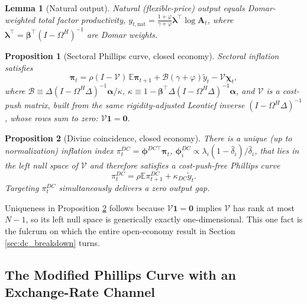 \documentclass[12pt]{article}
\newtheorem{lemma}{Lemma}
\newtheorem{proposition}{Proposition}
\begin{document}
\begin{lemma}[Natural output]
\label{lem:natural_output}
Natural (flexible-price) output equals Domar-weighted total factor productivity,
$y_{t,\mathrm{nat}} = \tfrac{1+\varphi}{\gamma+\varphi}\bm\lambda^\top\log\mathbf A_t$, where
$\bm\lambda^\top=\bm\beta^\top(I-\Omega^H)^{-1}$ are Domar weights.
\end{lemma}

\begin{proposition}[Sectoral Phillips curve, closed economy]
\label{prop:pc_closed}
Sectoral inflation satisfies
\begin{equation}
    \bm\pi_t = \rho(I-\mathcal V)\,\mathbb E\bm\pi_{t+1} + \mathcal B(\gamma+\varphi)\tilde y_t -
    \mathcal V\bm\chi_t,
    \label{eq:pc_closed}
\end{equation}
where $\mathcal B \equiv \Delta(I-\Omega^H\Delta)^{-1}\bm\alpha/\kappa$,
$\kappa\equiv1-\bm\beta^\top\Delta(I-\Omega^H\Delta)^{-1}\bm\alpha$, and $\mathcal V$ is a cost-push
matrix, built from the same rigidity-adjusted Leontief inverse $(I-\Omega^H\Delta)^{-1}$, whose rows
sum to zero: $\mathcal V\mathbf 1=\mathbf 0$.
\end{proposition}

\begin{proposition}[Divine coincidence, closed economy]
\label{prop:dc_closed}
There is a unique (up to normalization) inflation index $\pi_t^{DC}=\bm\phi^{DC\top}\bm\pi_t$,
$\bm\phi^{DC}_i \propto \lambda_i(1-\hat\delta_i)/\hat\delta_i$, that lies in the left null space of
$\mathcal V$ and therefore satisfies a cost-push-free Phillips curve
\begin{equation}
\pi_t^{DC}=\rho\mathbb E\pi_{t+1}^{DC} + \kappa_{DC}\tilde y_t. \label{eq:DCPC}
\end{equation}
Targeting $\pi_t^{DC}$ simultaneously
delivers a zero output gap.
\end{proposition}

Uniqueness in Proposition \ref{prop:dc_closed} follows because $\mathcal V\mathbf 1=\mathbf 0$ implies
$\mathcal V$ has rank at most $N-1$, so its left null space is generically exactly one-dimensional.
This one fact is the fulcrum on which the entire open-economy result in Section \ref{sec:dc_breakdown}
turns.

\subsection{The Modified Phillips Curve with an Exchange-Rate Channel}
\end{document}
